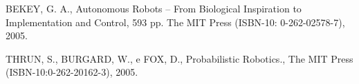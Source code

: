 {{        BEKEY, G. A., Autonomous Robots – From Biological Inspiration to Implementation and Control, 593 pp. The MIT Press (ISBN-10: 0-262-02578-7), 2005.

        THRUN, S., BURGARD, W., e FOX, D., Probabilistic Robotics., The MIT Press  (ISBN-10:0-262-20162-3), 2005.

    }
}